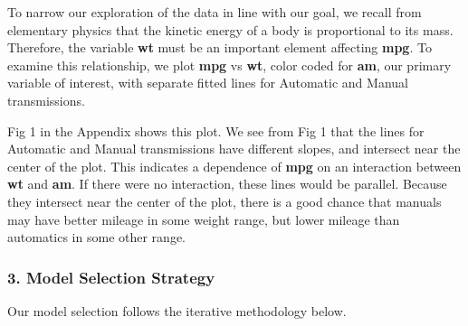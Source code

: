 \documentclass[10pt,]{article}
\begin{document}
To narrow our exploration of the data in line with our goal, we recall
from elementary physics that the kinetic energy of a body is
proportional to its mass. Therefore, the variable \textbf{wt} must be an
important element affecting \textbf{mpg}. To examine this relationship,
we plot \textbf{mpg} vs \textbf{wt}, color coded for \textbf{am}, our
primary variable of interest, with separate fitted lines for Automatic
and Manual transmissions.

Fig 1 in the Appendix shows this plot. We see from Fig 1 that the lines
for Automatic and Manual transmissions have different slopes, and
intersect near the center of the plot. This indicates a dependence of
\textbf{mpg} on an interaction between \textbf{wt} and \textbf{am}. If
there were no interaction, these lines would be parallel. Because they
intersect near the center of the plot, there is a good chance that
manuals may have better mileage in some weight range, but lower mileage
than automatics in some other range.

\subsubsection{3. Model Selection
Strategy}\label{model-selection-strategy}

Our model selection follows the iterative methodology below.
\end{document}
